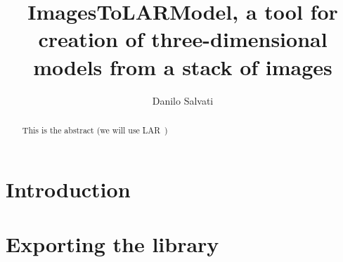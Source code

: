 \documentclass[11pt,oneside]{article}	%
\title{ImagesToLARModel, a tool for creation of three-dimensional models from a stack of images}
\author{Danilo Salvati}
\begin{document}
\maketitle

\begin{abstract}
This is the abstract (we will use LAR~\cite{cclar-proj:2013:00})

\end{abstract}

\newpage
\tableofcontents
\newpage

\section{Introduction}\label{sec:intro}

\section{Exporting the library}
\end{document}

